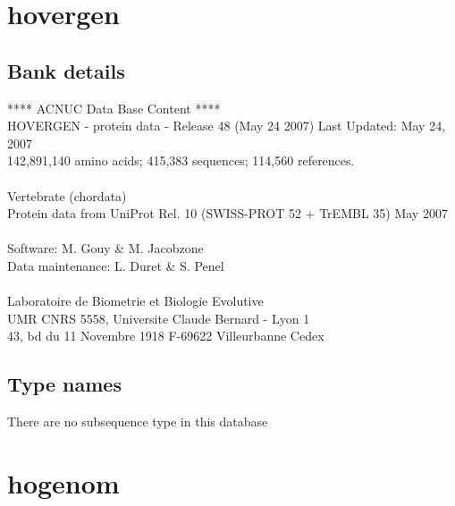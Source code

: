 \documentclass{article}
\begin{document}
\begin{Schunk}
\section{ hovergen }
\subsection{Bank details}
               ****     ACNUC Data Base Content      ****                       \\
 HOVERGEN - protein data - Release 48 (May 24 2007) Last Updated: May 24, 2007\\
          142,891,140 amino acids; 415,383 sequences; 114,560 references.\\
\\
                       Vertebrate (chordata)	  \\
    Protein data from UniProt Rel. 10 (SWISS-PROT 52 + TrEMBL 35) May 2007\\
\\
Software: M. Gouy \& M. Jacobzone\\
Data maintenance: L. Duret \& S. Penel\\
\\
Laboratoire de Biometrie et Biologie Evolutive\\
UMR CNRS 5558, Universite Claude Bernard - Lyon 1 \\
43, bd du 11 Novembre 1918 F-69622 Villeurbanne Cedex\\


\subsection{Type names}
There are no subsequence type in this database
\section{ hogenom }

\end{Schunk}
\end{document}

